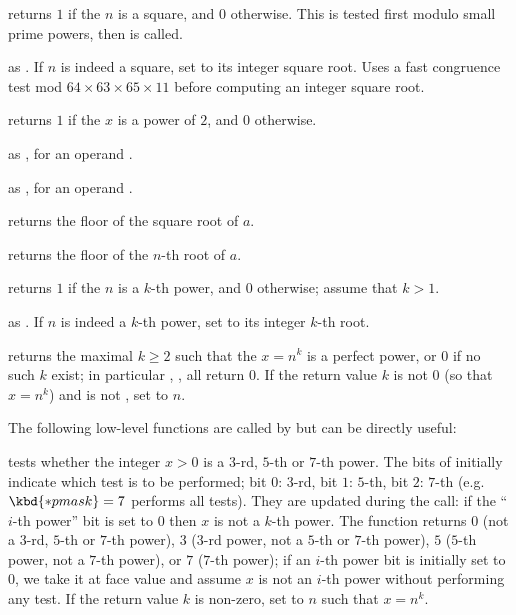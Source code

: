 
 returns $1$ if the  $n$ is
a square, and $0$ otherwise. This is tested first modulo small prime
powers, then  is called.

 as . If
$n$ is indeed a square, set  to its integer square root.
Uses a fast congruence test mod $64\times 63\times 65\times 11$ before
computing an integer square root.

 returns $1$ if the  $x$ is a power of
$2$, and $0$ otherwise.

 as ,
for an  operand .

 as ,
for an  operand .

 returns the floor of the square root of $a$.

 returns the floor of the $n$-th root
of $a$.

 returns $1$ if the  $n$ is a
$k$-th power, and $0$ otherwise; assume that $k > 1$.

 as . If
$n$ is indeed a $k$-th power, set  to its integer $k$-th root.

 returns the maximal $k\geq 2$  such
that the  $x = n^k$ is a perfect power, or $0$ if no such $k$ exist;
in particular , ,  all
return 0. If the return value $k$ is not $0$ (so that $x = n^k$) and
 is not , set  to $n$.

The following low-level functions are called by  but can
be directly useful:

 tests whether the
integer $x > 0$ is a $3$-rd, $5$-th or $7$-th power. The bits of 
initially indicate which test is to be performed;
bit $0$: $3$-rd,
bit $1$: $5$-th,
bit $2$: $7$-th (e.g.~$\kbd{*pmask} = 7$ performs all tests). They are
updated during the call: if the ``$i$-th power'' bit is set to $0$
then $x$ is not a $k$-th power. The function returns $0$
(not a
$3$-rd,
$5$-th or
$7$-th power),
$3$
($3$-rd power,
not a $5$-th or
$7$-th power),
$5$
($5$-th power,
not a $7$-th power),
or $7$
($7$-th power); if an $i$-th power bit is initially set to $0$, we take it
at face value and assume $x$ is not an $i$-th power without performing any
test. If the return value $k$ is non-zero, set  to $n$ such that $x
= n^k$.


